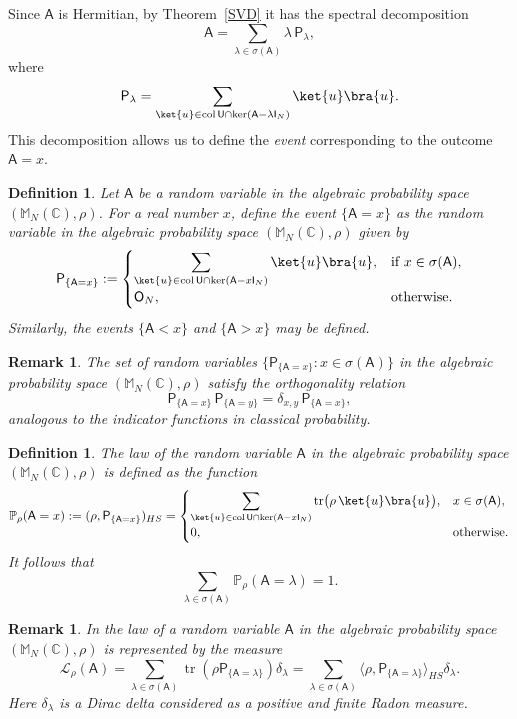 \documentclass[a4paper,11pt]{article}
\newtheorem{definition}[theorem]{Definition}
\newtheorem{remark}[theorem]{Remark}
\DeclareMathOperator{\tr}{tr}
\newcommand{\rI}{\mathsf{I}}
\newcommand{\rP}{\mathsf{P}}
\newcommand{\rU}{\mathsf{U}}
\newcommand{\rA}{\mathsf{A}}
\newcommand{\rO}{\mathsf{O}}
\begin{document}
Since \(\rA\) is Hermitian, by Theorem~\ref{SVD} it has the spectral decomposition
\[
\rA = \sum_{\lambda \in \sigma(\rA)} \lambda\, \rP_\lambda,
\]
where
\[
\rP_\lambda = \sum_{\ket{u} \in \mathrm{col}\,\rU \cap \ker(\rA-\lambda \rI_N)} \ket{u}\bra{u}.
\]
This decomposition allows us to define the \emph{event} corresponding to the outcome \(\rA = x\).

\begin{definition}
Let \(\rA\) be a random variable in the algebraic probability space \((\mathbb{M}_N(\mathbb{C}), \rho)\). For a real number \(x\), define the event \(\{\rA = x\}\) as the random variable in the algebraic probability space \((\mathbb{M}_N(\mathbb{C}), \rho)\) given by
\[
\rP_{\{\rA = x\}} :=
\begin{cases}
\displaystyle \sum_{\ket{u} \in \mathrm{col}\,\rU \cap \ker(\rA-x \rI_N)} \ket{u}\bra{u}, & \text{if } x \in \sigma(\rA), \\[1ex]
\rO_N, & \text{otherwise.}
\end{cases}
\]
Similarly, the events \(\{\rA < x\}\) and \(\{\rA > x\}\) may be defined.
\end{definition}

\begin{remark}
The set of random variables \(\{\rP_{\{\rA = x\}}: x \in \sigma(\rA)\}\) in the algebraic probability space \((\mathbb{M}_N(\mathbb{C}), \rho)\) satisfy the orthogonality relation
\[
\rP_{\{\rA = x\}}\,\rP_{\{\rA = y\}} = \delta_{x,y}\,\rP_{\{\rA = x\}},
\]
analogous to the indicator functions in classical probability.
\end{remark}

\begin{definition}
The \emph{law of the random variable} \(\rA\) in the algebraic probability space \((\mathbb{M}_N(\mathbb{C}), \rho)\) is defined as the function
\[
\mathbb{P}_{\rho}(\rA = x) := (\rho, \rP_{\{\rA = x\}})_{HS} =
\begin{cases}
\displaystyle \sum_{\ket{u} \in \mathrm{col}\,\rU \cap \ker(\rA-x \rI_N)} \tr\bigl(\rho\,\ket{u}\bra{u}\bigr), & x \in \sigma(\rA), \\[1ex]
0, & \text{otherwise.}
\end{cases}
\]
It follows that
\[
\sum_{\lambda \in \sigma(\rA)} \mathbb{P}_{\rho}(\rA = \lambda) = 1.
\]
\end{definition}

\begin{remark}
In \cite{FranzPrivault2016} the law of a random variable $\rA$ in the algebraic probability space \((\mathbb{M}_N(\mathbb{C}), \rho)\) is represented by the measure
$$
\mathcal{L}_{\rho}(\rA) = \sum_{\lambda \in \sigma(\rA)} \tr(\rho \rP_{\{\rA = \lambda\}}) \delta_{\lambda}
=  \sum_{\lambda \in \sigma(\rA)} \langle\rho,\rP_{\{\rA = \lambda\}} \rangle_{HS} \delta_{\lambda}.
$$
Here $\delta_{\lambda}$ is a Dirac delta considered as a positive and finite Radon measure.
\end{remark}
\end{document}
